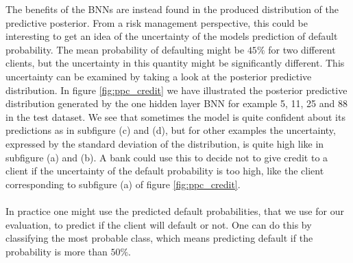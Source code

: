 \begin{table} 
\caption{Performance measurement for Bayesian neural network models on credit card default data. The Python code used to implement these Bayesian neural networks can be seen in appendix \ref{app:Credit_BNN}.}
\label{tab:credit_BNN_performance}
\end{table}
\noindent
The benefits of the BNNs are instead found in the produced distribution of the predictive posterior. From a risk management perspective, this could be interesting to get an idea of the uncertainty of the models prediction of default probability. The mean probability of defaulting might be $45 \%$ for two different clients, but the uncertainty in this quantity might be significantly different. This uncertainty can be examined by taking a look at the posterior predictive distribution. In figure \ref{fig:ppc_credit} we have illustrated the posterior predictive distribution generated by the one hidden layer BNN for example 5, 11, 25 and 88 in the test dataset. We see that sometimes the model is quite confident about its predictions as in subfigure (c) and (d), but for other examples the uncertainty, expressed by the standard deviation of the distribution, is quite high like in subfigure (a) and (b). A bank could use this to decide not to give credit to a client if the uncertainty of the default probability is too high, like the client corresponding to subfigure (a) of figure \ref{fig:ppc_credit}.
\\
\\
In practice one might use the predicted default probabilities, that we use for our evaluation, to predict if the client will default or not. One can do this by classifying the most probable class, which means predicting default if the probability is more than $50 \%$.
